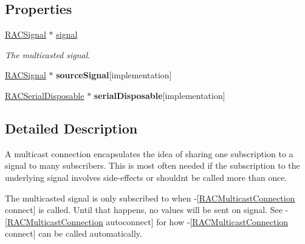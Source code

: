 \subsection*{Properties}
\begin{DoxyCompactItemize}
\item 
\mbox{\label{interface_r_a_c_multicast_connection_a5e9211efab197ed35e1b79431d053c7e}} 
\mbox{\hyperlink{interface_r_a_c_signal}{R\+A\+C\+Signal}} $\ast$ \mbox{\hyperlink{interface_r_a_c_multicast_connection_a5e9211efab197ed35e1b79431d053c7e}{signal}}
\begin{DoxyCompactList}\small\item\em The multicasted signal. \end{DoxyCompactList}\item 
\mbox{\label{interface_r_a_c_multicast_connection_a57a939af480a61e49746ae8c0f2cdf5d}} 
\mbox{\hyperlink{interface_r_a_c_signal}{R\+A\+C\+Signal}} $\ast$ {\bfseries source\+Signal}{\ttfamily  \mbox{[}implementation\mbox{]}}
\item 
\mbox{\label{interface_r_a_c_multicast_connection_a9b72b61ecfcd5348faf7b9b45db22be3}} 
\mbox{\hyperlink{interface_r_a_c_serial_disposable}{R\+A\+C\+Serial\+Disposable}} $\ast$ {\bfseries serial\+Disposable}{\ttfamily  \mbox{[}implementation\mbox{]}}
\end{DoxyCompactItemize}


\subsection{Detailed Description}
A multicast connection encapsulates the idea of sharing one subscription to a signal to many subscribers. This is most often needed if the subscription to the underlying signal involves side-\/effects or shouldn\textquotesingle{}t be called more than once.

The multicasted signal is only subscribed to when -\/\mbox{[}\mbox{\hyperlink{interface_r_a_c_multicast_connection}{R\+A\+C\+Multicast\+Connection}} connect\mbox{]} is called. Until that happens, no values will be sent on {\ttfamily signal}. See -\/\mbox{[}\mbox{\hyperlink{interface_r_a_c_multicast_connection}{R\+A\+C\+Multicast\+Connection}} autoconnect\mbox{]} for how -\/\mbox{[}\mbox{\hyperlink{interface_r_a_c_multicast_connection}{R\+A\+C\+Multicast\+Connection}} connect\mbox{]} can be called automatically.

